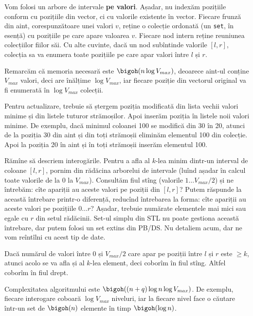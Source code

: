 Vom folosi un arbore de intervale \textbf{pe valori}. Așadar, nu indexăm pozițiile conform cu pozițiile din vector, ci cu valorile existente în vector. Fiecare frunză din aint, corespunzătoare unei valori $v$, reține o colecție ordonată (un \texttt{set}, în esență) cu pozițiile pe care apare valoarea $v$. Fiecare nod intern reține reuniunea colecțiilor fiilor săi. Cu alte cuvinte, dacă un nod subîntinde valorile $[l, r]$, colecția sa va enumera toate pozițiile pe care apar valori între $l$ și $r$.

Remarcăm că memoria necesară este $\bigoh(n \log V_{max})$, deoarece aint-ul conține $V_{max}$ valori, deci are înălțime $\log V_{max}$, iar fiecare poziție din vectorul original va fi enumerată în $\log V_{max}$ colecții.

Pentru actualizare, trebuie să ștergem poziția modificată din lista vechii valori minime și din listele tuturor strămoșilor. Apoi inserăm poziția în listele noii valori minime. De exemplu, dacă minimul coloanei 100 se modifică din 30 în 20, atunci de la poziția 30 din aint și din toți strămoșii eliminăm elementul 100 din colecție. Apoi la poziția 20 în aint și în toți strămoșii inserăm elementul 100.

Rămîne să descriem interogările. Pentru a afla al $k$-lea minim dintr-un interval de coloane $[l, r]$, pornim din rădăcina arborelui de intervale (luînd așadar în calcul toate valorile de la 0 la $V_{max}$). Consultăm fiul stîng (valorile $1 \dots V_{max}/2$) și ne întrebăm: cîte apariții au aceste valori pe poziții din $[l, r]$? Putem răspunde la această întrebare printr-o diferență, reducînd întrebarea la forma: cîte apariții au aceste valori pe pozițiile $0 \dots r$? Așadar, trebuie numărate elementele mai mici sau egale cu $r$ din setul rădăcinii. Set-ul simplu din STL nu poate gestiona această întrebare, dar putem folosi un set extins din PB/DS. Nu detaliem acum, dar ne vom reîntîlni cu acest tip de date.

Dacă numărul de valori între 0 și $V_{max}/2$ care apar pe poziții între $l$ și $r$ este $\geq k$, atunci acolo se va afla și al $k$-lea element, deci coborîm în fiul stîng. Altfel coborîm în fiul drept.

Complexitatea algoritmului este $\bigoh((n + q) \log n \log V_{max})$. De exemplu, fiecare interogare coboară $\log V_{max}$ niveluri, iar la fiecare nivel face o căutare într-un set de $\bigoh(n)$ elemente în timp $\bigoh(\log n)$.
